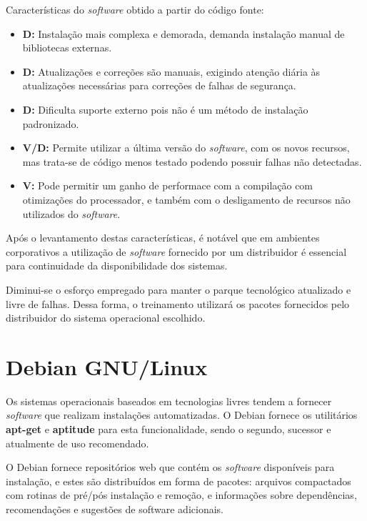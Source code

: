     Características do {\it software} obtido a partir do código fonte:

\begin{itemize}
\item{\bf } {\bf D:} Instalação mais complexa e demorada, demanda instalação
manual de bibliotecas externas.

\item{\bf } {\bf D:} Atualizações e correções são manuais, exigindo atenção
diária às atualizações necessárias para correções de falhas de segurança.

\item{\bf } {\bf D:} Dificulta suporte externo pois não é um método de
instalação padronizado.

\item{\bf } {\bf V/D:} Permite utilizar a última versão do {\it software},
com os novos recursos, mas trata-se de código menos testado podendo possuir
falhas não detectadas.

\item{\bf } {\bf V:} Pode permitir um ganho de performace com a compilação com
otimizações do processador, e também com o desligamento de recursos não
utilizados do {\it software}.

\end{itemize}

    Após o levantamento destas características, é notável que em ambientes
corporativos a utilização de {\it software} fornecido por um distribuidor é
essencial para continuidade da disponibilidade dos sistemas.

    Diminui-se o esforço empregado para manter o parque tecnológico atualizado
e livre de falhas. Dessa forma, o treinamento utilizará os pacotes fornecidos
pelo distribuidor do sistema operacional escolhido.

\section{Debian GNU/Linux}\setcounter{SteP}{1}

    Os sistemas operacionais baseados em tecnologias livres tendem a fornecer
{\it software} que realizam instalações automatizadas. O Debian fornece os
utilitários {\bf apt-get} e {\bf aptitude} para esta funcionalidade, sendo o
segundo, sucessor e atualmente de uso recomendado.

    O Debian fornece repositórios web que contém os {\it software}
disponíveis para instalação, e estes são distribuídos em forma de pacotes:
arquivos compactados com rotinas de pré/pós instalação e remoção, e
informações sobre dependências, recomendações e sugestões de software
adicionais.

